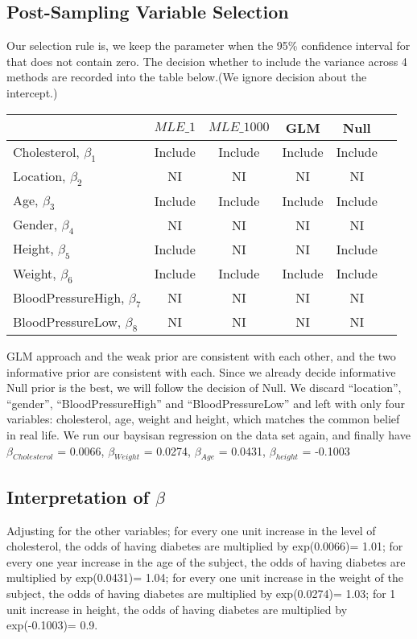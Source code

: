 \documentclass[paper=letterpaper,fontsize=12pt,twoside,american]{scrartcl}
\begin{document}
\subsection{Post-Sampling Variable Selection}
Our selection rule is, we keep the parameter when the 95\% confidence interval for that does not contain zero. The decision whether to include the variance across 4 methods are recorded into the table below.(We ignore decision about the intercept.)

\begin{table}[H]
\footnotesize
\setlength{\tabcolsep}{10pt}
\centering
\begin{tabular}{l*{5}{|c}}
\hline\hline			 	& $MLE\_1$ & $MLE\_1000$ & GLM      &Null\\\hline
Cholesterol, $\beta_{1}$ 	&  Include  & Include    &Include   & Include\\ \hline
Location, $\beta_{2}$	 	&  NI  		&NI  		&	 NI   &NI 	\\ \hline
Age, $\beta_{3}$ 			&  Include  &  Include   &Include &Include\\ \hline
Gender, $\beta_{4}$			&  NI   	&  NI  		 &	 NI   &NI	\\ \hline
Height, $\beta_{5}$			& Include    & NI  		&   NI    & Include\\ \hline
Weight, $\beta_{6}$			& Include    & Include   &Include &Include\\ \hline
BloodPressureHigh, $\beta_{7}$& NI 		& NI  		 &NI	 &NI\\ \hline
BloodPressureLow, $\beta_{8}$& NI		&  NI  		&	NI   & NI	\\ \hline
\end{tabular}
\end{table}

 GLM approach and the weak prior are consistent with each other, and the two informative prior are consistent with each. Since we already decide informative Null prior is the best, we will follow the decision of Null. We discard “location”, “gender”, “BloodPressureHigh” and “BloodPressureLow” and left with only four variables: cholesterol, age, weight and height, which matches the common belief in real life. We run our baysisan regression on the data set again, and finally have $\beta_{Cholesterol}$ = 0.0066, $\beta_{Weight}$ = 0.0274, $\beta_{Age}$ = 0.0431, $\beta_{height}$ = -0.1003 

\subsection{Interpretation of $\beta$}
Adjusting for the other variables; for every one unit increase in the level of cholesterol, the odds of having diabetes are multiplied by exp(0.0066)= 1.01; for every one year increase in the age of the subject, the odds of having diabetes are multiplied by exp(0.0431)= 1.04; for every one unit increase in the weight of the subject, the odds of having diabetes are multiplied by exp(0.0274)= 1.03; for 1 unit increase in height, the odds of having diabetes are multiplied by exp(-0.1003)= 0.9.
\end{document}
